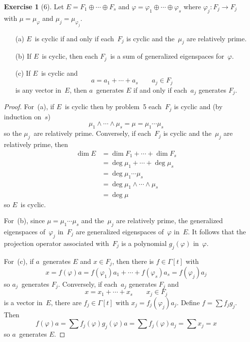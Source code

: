 \documentclass[letterpaper,12pt]{article}
\newcommand{\meet}{\wedge}
\newcommand{\dsum}{\oplus}
\newcommand{\multi}[4]{#2_{#3}#1\cdots#1#2_{#4}}
\newcommand{\dsums}[3]{\multi{\dsum}{#1}{#2}{#3}}
\theoremstyle{definition}
\newtheorem*{exer}{Exercise}
\theoremstyle{remark}
\begin{document}
\begin{exer}[6]
Let \(E=\dsums{F}{1}{s}\) and \(\varphi=\dsums{\varphi}{1}{s}\) where \(\varphi_j:F_j\to F_j\) with \(\mu=\mu_{\varphi}\) and \(\mu_j=\mu_{\varphi_j}\).
\begin{enumerate}
\item[(a)] \(E\)~is cyclic if and only if each~\(F_j\) is cyclic and the~\(\mu_j\) are relatively prime.
\item[(b)] If \(E\)~is cyclic, then each \(F_j\)~is a sum of generalized eigenspaces for~\(\varphi\).
\item[(c)] If \(E\)~is cyclic and
\[a=a_1+\cdots+a_s\qquad a_j\in F_j\]
is any vector in~\(E\), then \(a\)~generates \(E\) if and only if each~\(a_j\) generates \(F_j\).
\end{enumerate}
\end{exer}
\begin{proof}
For~(a), if \(E\)~is cyclic then by problem~5 each~\(F_j\) is cyclic and (by induction on~\(s\))
\[\mu_1\meet\cdots\meet\mu_s=\mu=\mu_1\cdots\mu_s\]
so the \(\mu_j\)~are relatively prime. Conversely, if each~\(F_j\) is cyclic and the~\(\mu_j\) are relatively prime, then
\begin{align*}
\dim E&=\dim F_1+\cdots+\dim F_s\\
	&=\deg\mu_1+\cdots+\deg\mu_s\\
	&=\deg\mu_1\cdots\mu_s\\
	&=\deg\mu_1\meet\cdots\meet\mu_s\\
	&=\deg\mu
\end{align*}
so \(E\)~is cyclic.

For~(b), since \(\mu=\mu_1\cdots\mu_s\) and the~\(\mu_j\) are relatively prime, the generalized eigenspaces of~\(\varphi_j\) in~\(F_j\) are generalized eigenspaces of~\(\varphi\) in~\(E\). It follows that the projection operator associated with~\(F_j\) is a polynomial \(g_j(\varphi)\) in~\(\varphi\).

For~(c), if \(a\)~generates \(E\) and \(x\in F_j\), then there is \(f\in\Gamma[t]\) with
\[x=f(\varphi)a=f(\varphi_1)a_1+\cdots+f(\varphi_s)a_s=f(\varphi_j)a_j\]
so \(a_j\)~generates \(F_j\). Conversely, if each~\(a_j\) generates \(F_j\) and
\[x=x_1+\cdots+x_s\qquad x_j\in F_j\]
is a vector in~\(E\), there are \(f_j\in\Gamma[t]\) with \(x_j=f_j(\varphi_j)a_j\). Define \(f=\sum f_jg_j\). Then
\[f(\varphi)a=\sum f_j(\varphi)g_j(\varphi)a=\sum f_j(\varphi)a_j=\sum x_j=x\]
so \(a\)~generates \(E\).
\end{proof}
\end{document}

